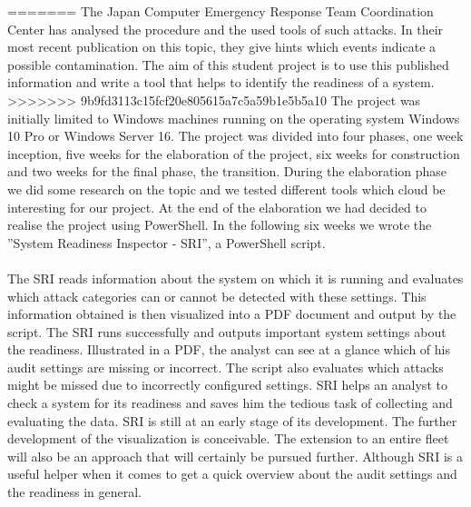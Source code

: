 =======
The Japan Computer Emergency Response Team Coordination Center has analysed the procedure and the used tools of such attacks. In their most recent publication on this topic, they give hints which events indicate a possible contamination. The aim of this student project is to use this published information and write a tool that helps to identify the readiness of a system.
\vspace{-0.25cm}
>>>>>>> 9b9fd3113c15fcf20e805615a7c5a59b1e5b5a10
\thispagestyle{plain}
The project was initially limited to Windows machines running on the operating system Windows 10 Pro or Windows Server 16. The project was divided into four phases, one week inception, five weeks for the elaboration of the project, six weeks for construction and two weeks for the final phase, the transition. During the elaboration phase we did some research on the topic and we tested different tools which cloud be interesting for our project. At the end of the elaboration we had decided to realise the project using PowerShell. In the following six weeks we wrote the ''System Readiness Inspector - SRI'', a PowerShell script. \\\\
The SRI reads information about the system on which it is running and evaluates which attack categories can or cannot be detected with these settings. This information obtained is then visualized into a PDF document and output by the script.
\vspace{-0.25cm}
\thispagestyle{plain}
The SRI runs successfully and outputs important system settings about the readiness. Illustrated in a PDF, the analyst can see at a glance which of his audit settings are missing or incorrect. The script also evaluates which attacks might be missed due to incorrectly configured settings. SRI helps an analyst to check a system for its readiness and saves him the tedious task of collecting and evaluating the data.
\vspace{-0.25cm}
\thispagestyle{plain}
SRI is still at an early stage of its development. The further development of the visualization is conceivable. The extension to an entire fleet will also be an approach that will certainly be pursued further. Although SRI is a useful helper when it comes to get a quick overview about the audit settings and the readiness in general.



\renewcommand\section{\clearpage\stdsection}